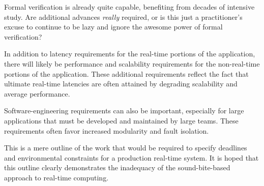 \QuickQuiz{}
	Formal verification is already quite capable, benefiting from
	decades of intensive study.
	Are additional advances \emph{really} required, or is this
	just a practitioner's excuse to continue to be lazy and ignore
	the awesome power of formal verification?
 \QuickQuizEnd

In addition to latency requirements for the real-time portions of the
application, there will likely be performance and scalability requirements
for the non-real-time portions of the application.
These additional requirements reflect the fact that ultimate real-time
latencies are often attained by degrading scalability and average performance.

Software-engineering requirements can also be important, especially for
large applications that must be developed and maintained by large teams.
These requirements often favor increased modularity and fault isolation.

This is a mere outline of the work that would be required to specify
deadlines and environmental constraints for a production real-time system.
It is hoped that this outline clearly demonstrates the inadequacy of
the sound-bite-based approach to real-time computing.

